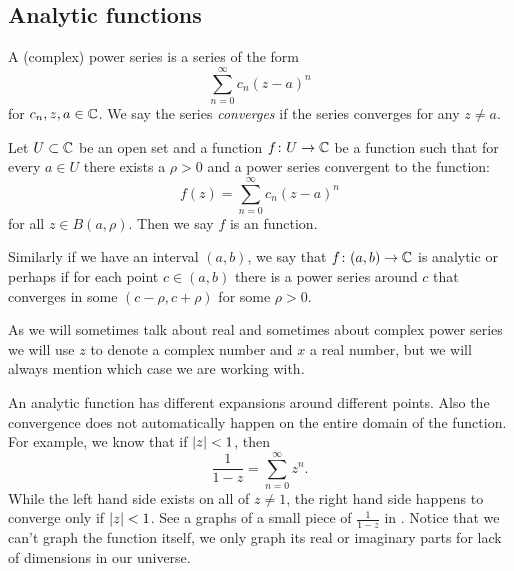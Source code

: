 
\subsection{Analytic functions}

A (complex) power series is a series of the form
\begin{equation*}
\sum_{n=0}^\infty c_n {(z-a)}^n
\end{equation*}
for $c_n, z, a \in {\mathbb{C}}$.  We say the series
\emph{converges} if the series converges for
any $z \not= a$.

Let $U \subset {\mathbb{C}}$ be an open set and
a function $f \colon U \to {\mathbb{C}}$ be a function such that
for every $a \in U$ there exists a $\rho > 0$ and a power
series convergent to the function:
\begin{equation*}
f(z) = \sum_{n=0}^\infty c_n {(z-a)}^n
\end{equation*}
for all $z \in B(a,\rho)$.
Then we say $f$ is an \emph{} function.

Similarly if we have an interval $(a,b)$, we say that $f \colon (a,b)
\to {\mathbb{C}}$ is analytic or perhaps \emph{}
if for each point $c \in
(a,b)$ there is a power series around $c$ that converges in some
$(c-\rho,c+\rho)$
for some $\rho > 0$.

As we will sometimes talk about real and sometimes about complex power
series we will use $z$ to denote a complex number and $x$ a real number, but
we will always mention which case we are working with.

An analytic function has different expansions around different
points.  Also the convergence does not automatically happen on the entire
domain of the function.  For example, we know that if $\lvert {z} \rvert < 1$, then
\begin{equation*}
\frac{1}{1-z} = \sum_{n=0}^\infty z^n .
\end{equation*}
While the left hand side exists on all of $z \not= 1$, the right hand side
happens to converge only if $\lvert {z} \rvert < 1$.  See a graphs
of a small piece of $\frac{1}{1-z}$ in .
Notice that we can't graph the
function itself, we only graph its real or imaginary parts for lack
of dimensions in our universe.

